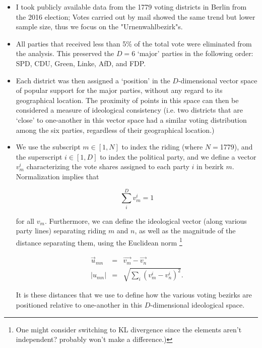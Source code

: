 \documentclass[amsmath,amssymb,nofootinbib,12pt,preprint]{revtex4}
\begin{document}
\begin{itemize}
\item  I took publicly available data from the  1779 voting districts in Berlin from the 2016 election; Votes carried out by mail showed the same trend but lower sample size, thus we focus on the "Urnenwahlbezirk"s.

\item All parties that received less than 5\% of the total vote were eliminated from the analysis. This preserved the $D=$6 `major'  parties in the following order: SPD, CDU, Green, Linke, AfD, and FDP.

\item Each district was then assigned a `position' in the $D$-dimensional vector space of popular support for the major parties, without any regard to its geographical location. The proximity of points in this space can then be considered a measure of ideological consistency (i.e. two districts that are `close' to one-another in this vector space had a similar voting distribution among the six parties, regardless of their geographical location.)

\item We use the subscript $m\in [1,N]$ to index the riding (where $N=$1779), and the superscript $i\in [1,D]$ to index the political party, and we define a vector $v^{i}_{m}$ characterizing the vote shares assigned to each party $i$ in bezirk $m$. Normalization implies that 

\begin{equation}
\sum\limits_{i}^{D}v^i_m =1
\end{equation}

for all $v_m$. Furthermore, we can define the ideological vector (along various party lines) separating riding $m$ and $n$, as well as the magnitude of the distance separating them, using the Euclidean norm \footnote{ {\color{red} One might consider switching to KL divergence since the elements aren't independent? probably won't make a difference.)} } 

\begin{align}
\vec u_{mn} &=& \vec {v_m} - \vec{v_n} \\
\left| u_{mn}\right| &=& \sqrt{  \sum\limits_{i}\left( v_m^i - v_n^i \right)^2 }.
\end{align}

It is these distances that we use to define how the various voting bezirks are positioned relative to one-another in this $D$-dimensional ideological space.

\end{itemize}
\end{document}

